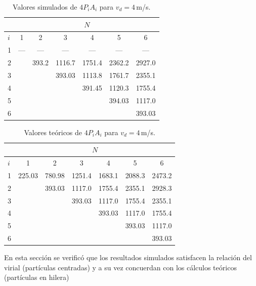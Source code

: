 \begin{table}[h!]
\caption {Valores simulados de $4P_iA_i$ para $v_d=4\,$m/s.}
\label{simulados}
\begin{center}
\begin{tabular}{|l|cccccc|}
\hline
      & \multicolumn{6}{c|}{$N$} \\
\hline
$i$   &  1   &   2    &  3       &  4     &  5     &   6     \\
\hline
 1    &  --- &  ---   &  ---     & ---    & ---    & ---     \\
 2    &      &  393.2 &  1116.7  & 1751.4 & 2362.2 & 2927.0  \\
 3    &      &        &  393.03  & 1113.8 & 1761.7 & 2355.1  \\
 4    &      &        &          & 391.45 & 1120.3 & 1755.4  \\
 5    &      &        &          &        & 394.03 & 1117.0  \\
 6    &      &        &          &        &        & 393.03  \\
\hline
\end{tabular}
\end{center}
\end{table}



\begin{table}[h!]
\caption {Valores teóricos de $4P_iA_i$ para $v_d=4\,$m/s.}
\label{teoricos}
\begin{center}
\begin{tabular}{|l|cccccc|}
\hline
      & \multicolumn{6}{c|}{$N$} \\
\hline
$i$   &  1         &   2        &  3       &  4     &  5     &   6   \\
\hline
 1    &  225.03    &  780.98    &  1251.4  & 1683.1 & 2088.3 & 2473.2 \\
 2    &            &  393.03    &  1117.0  & 1755.4 & 2355.1 & 2928.3 \\
 3    &            &            &  393.03  & 1117.0 & 1755.4 & 2355.1 \\
 4    &            &            &          & 393.03 & 1117.0 & 1755.4 \\
 5    &            &            &          &        & 393.03 & 1117.0 \\
 6    &            &            &          &        &        & 393.03 \\
\hline
\end{tabular}
\end{center}
\end{table}


En esta sección se verificó que los resultados simulados satisfacen la relación del virial (partículas centradas) y a su vez concuerdan con los cálculos teóricos (partículas en hilera)


